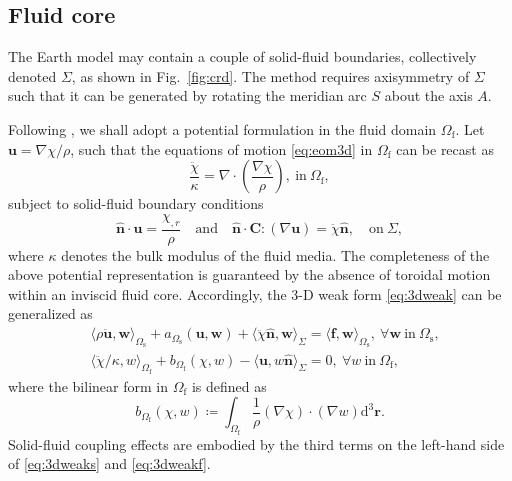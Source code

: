 \documentclass[extra,referee]{gji}
\begin{document}
\begin{appendices}
\section{Fluid core}
\label{sec:fluid}
The Earth model may contain a couple of solid-fluid boundaries, 
collectively denoted $\Sigma$, as shown in Fig.~\ref{fig:crd}. 
The method requires axisymmetry of $\Sigma$ such that it can 
be generated by rotating the meridian arc $S$ about the axis $A$. 

Following \cite{chaljub2004spectral, 
nissen2007axisem}, we shall adopt a potential formulation in the fluid 
domain $\Omega_{\text{f}}$. Let $\mathbf{u} = \nabla\chi/\rho$,
such that the equations of motion \eqref{eq:eom3d} in $\Omega_{\text{f}}$
can be recast as
\begin{equation}
  \frac{\ddot{\chi}}{\kappa} = \nabla\cdot\left(
  \frac{\nabla\chi}{\rho}\right), \ \text{in} \ \Omega_{\text{f}},
\end{equation}
subject to solid-fluid boundary conditions
\begin{equation}
  \hat{\mathbf{n}}\cdot\mathbf{u}=\frac{\chi_{,r}}{\rho}
  \quad \text{and} \quad 
  \hat{\mathbf{n}}\cdot\mathbf{C}:\left(\nabla\mathbf{u}\right)= 
  \ddot{\chi}\hat{\mathbf{n}}, \quad \text{on} \ \Sigma,
\end{equation}
where $\kappa$ denotes the bulk modulus of the fluid media. 
The completeness of the above potential representation is 
guaranteed by the absence of toroidal motion within an inviscid fluid core.
Accordingly, the 3-D weak form \eqref{eq:3dweak} can be generalized as
\begin{align}
&  \langle \rho\ddot{\mathbf{u}},\mathbf{w}\rangle_{\Omega_\text{s}}\!+\!
  a_{\Omega_\text{s}}\left(\mathbf{u},\mathbf{w}\right)\!+\!
  \langle \ddot{\chi}\hat{\mathbf{n}},\mathbf{w}\rangle_{\Sigma}
  \!=\!\langle \mathbf{f},\mathbf{w}\rangle_{\Omega_\text{s}}
  ,\ \forall\mathbf{w}\ \text{in}\ \Omega_\text{s},
  \label{eq:3dweaks}\\[.5em]
&  \langle \ddot{\chi}/\kappa,w \rangle_{\Omega_\text{f}}\!+\!
  b_{\Omega_\text{f}}\left(\chi,w\right)\!-\!
  \langle \mathbf{u}, w\hat{\mathbf{n}}\rangle_{\Sigma}
  \!=\!0,\ \forall w\ \text{in}\ \Omega_\text{f},
  \label{eq:3dweakf}
\end{align}
where the bilinear form in $\Omega_\text{f}$ is defined as
\begin{equation}
  b_{\Omega_\text{f}}\left(\chi,w\right) \coloneqq
  \int_{\Omega_\text{f}} \frac{1}{\rho}
  \left(\nabla\chi\right) \cdot \left(\nabla w\right) \text{d}^{3}\mathbf{r}.
\end{equation}
Solid-fluid coupling effects are embodied by the third terms
on the left-hand side of \eqref{eq:3dweaks} and \eqref{eq:3dweakf}.


\end{appendices}
\end{document}
